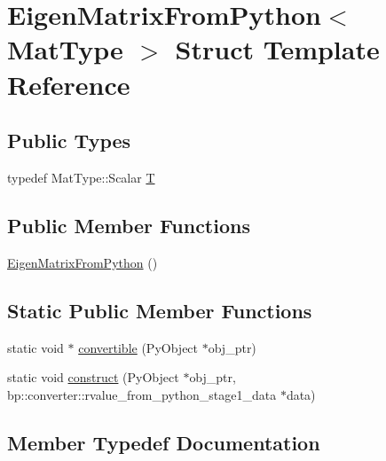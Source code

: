 \hypertarget{structEigenMatrixFromPython}{}\section{Eigen\+Matrix\+From\+Python$<$ Mat\+Type $>$ Struct Template Reference}
\label{structEigenMatrixFromPython}
\subsection*{Public Types}
\begin{DoxyCompactItemize}
\item 
typedef Mat\+Type\+::\+Scalar \hyperlink{structEigenMatrixFromPython_a8885900b36ff931d90b9d2b572c6edb1}{T}
\end{DoxyCompactItemize}
\subsection*{Public Member Functions}
\begin{DoxyCompactItemize}
\item 
\hyperlink{structEigenMatrixFromPython_a86d49b77f8df143e48855b2b4c7371ad}{Eigen\+Matrix\+From\+Python} ()
\end{DoxyCompactItemize}
\subsection*{Static Public Member Functions}
\begin{DoxyCompactItemize}
\item 
static void $\ast$ \hyperlink{structEigenMatrixFromPython_a2759081c69a7716b9ee7c7bfab33671c}{convertible} (Py\+Object $\ast$obj\+\_\+ptr)
\item 
static void \hyperlink{structEigenMatrixFromPython_ab0fa3bbc6332e98fee9f5c26476d0fa0}{construct} (Py\+Object $\ast$obj\+\_\+ptr, bp\+::converter\+::rvalue\+\_\+from\+\_\+python\+\_\+stage1\+\_\+data $\ast$data)
\end{DoxyCompactItemize}


\subsection{Member Typedef Documentation}
\mbox{\label{structEigenMatrixFromPython_a8885900b36ff931d90b9d2b572c6edb1}} 
